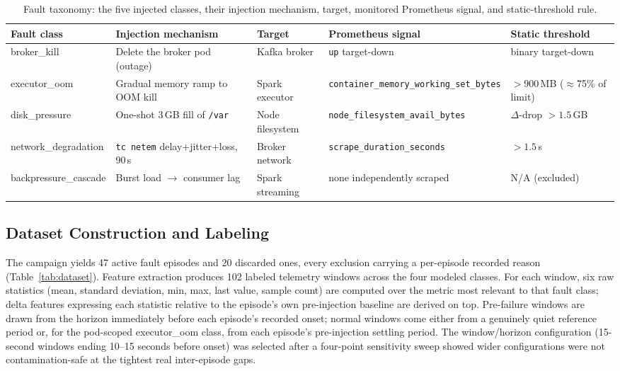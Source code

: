 \documentclass[conference]{IEEEtran}
\newcommand{\bk}{broker\_kill}
\newcommand{\eo}{executor\_oom}
\newcommand{\dpr}{disk\_pressure}
\newcommand{\nd}{network\_degradation}
\newcommand{\bc}{backpressure\_cascade}
\begin{document}
\begin{table}[!t]
\caption{Fault taxonomy: the five injected classes, their injection mechanism, target, monitored Prometheus signal, and static-threshold rule.}
\label{tab:taxonomy}
\centering
\footnotesize
\begin{tabular}{@{}lllll@{}}
\toprule
\textbf{Fault class} & \textbf{Injection mechanism} & \textbf{Target} & \textbf{Prometheus signal} & \textbf{Static threshold} \\
\midrule
\bk{}  & Delete the broker pod (outage)          & Kafka broker      & \texttt{up} target-down                       & binary target-down \\
\eo{}  & Gradual memory ramp to OOM kill         & Spark executor    & \texttt{container\_memory\_working\_set\_bytes} & $>900$\,MB ($\approx$75\% of limit) \\
\dpr{} & One-shot 3\,GB fill of \texttt{/var}    & Node filesystem   & \texttt{node\_filesystem\_avail\_bytes}       & $\Delta$-drop $>1.5$\,GB \\
\nd{}  & \texttt{tc netem} delay+jitter+loss, 90\,s & Broker network  & \texttt{scrape\_duration\_seconds}            & $>1.5$\,s \\
\bc{}  & Burst load $\rightarrow$ consumer lag   & Spark streaming   & none independently scraped                    & N/A (excluded) \\
\bottomrule
\end{tabular}
\end{table}

\subsection{Dataset Construction and Labeling}
The campaign yields 47 active fault episodes and 20 discarded ones, every exclusion carrying a per-episode recorded reason (Table~\ref{tab:dataset}). Feature extraction produces 102 labeled telemetry windows across the four modeled classes. For each window, six raw statistics (mean, standard deviation, min, max, last value, sample count) are computed over the metric most relevant to that fault class; delta features expressing each statistic relative to the episode's own pre-injection baseline are derived on top. Pre-failure windows are drawn from the horizon immediately before each episode's recorded onset; normal windows come either from a genuinely quiet reference period or, for the pod-scoped \eo{} class, from each episode's pre-injection settling period. The window/horizon configuration (15-second windows ending 10--15 seconds before onset) was selected after a four-point sensitivity sweep showed wider configurations were not contamination-safe at the tightest real inter-episode gaps.
\end{document}
